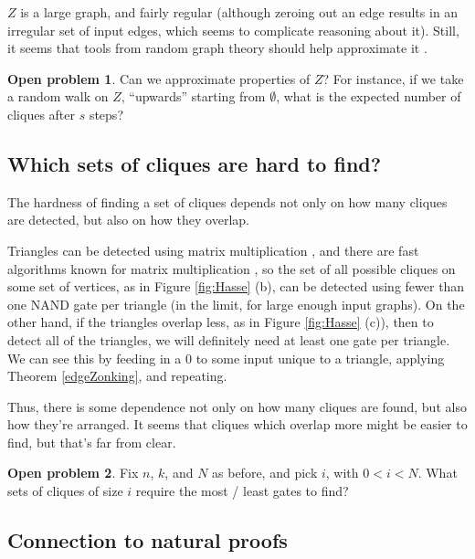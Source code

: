 \documentclass[12pt]{article}
\theoremstyle{definition}
\newtheorem{prob}{Open problem}[section]
\begin{document}
$Z$ is a large graph, and fairly regular (although zeroing out an edge results
in an irregular set of input edges, which seems to complicate reasoning about it).
Still, it seems that tools from
random graph theory should help approximate it \cite{bollobas1976cliques}.

\begin{prob} \label{edgeZonkingApprox}
Can we approximate properties of $Z$? For instance, if we take a random walk
on $Z$, ``upwards'' starting from $\emptyset$,
what is the expected number of cliques after $s$ steps?
\end{prob}

\subsection{Which sets of cliques are hard to find?}
\label{sec:whichCliques}

The hardness of finding a set of cliques
depends not only on how many cliques are detected,
but also on how they overlap.

Triangles can be detected using matrix multiplication \cite{itai_finding_1977},
and there are fast algorithms known for matrix multiplication
\cite{strassen_gaussian_1969}
\cite{williams_multiplying_2012}, so the set of all possible
cliques on some set of vertices, as in
Figure \ref{fig:Hasse} (b),
 can be detected
using fewer than one NAND gate per triangle (in the limit,
for large enough input graphs).
On the other hand, if the triangles overlap less, as in
Figure \ref{fig:Hasse} (c)),
then to detect all of the triangles, we will definitely need at least one
gate per triangle. We can see this by feeding in a 0 to some input
unique to a triangle, applying Theorem \ref{edgeZonking}, and repeating.

Thus, there is some dependence not only on how many cliques are found, but
also how they're arranged. It seems that cliques which overlap more might
be easier to find, but that's far from clear.

\begin{prob}
\label{overlapEffect}
Fix $n$, $k$, and $N$ as before, and pick $i$, with
$0 < i < N$. What sets of cliques of size $i$
require the most / least gates to find?
\end{prob}

\subsection{Connection to natural proofs}
\end{document}
